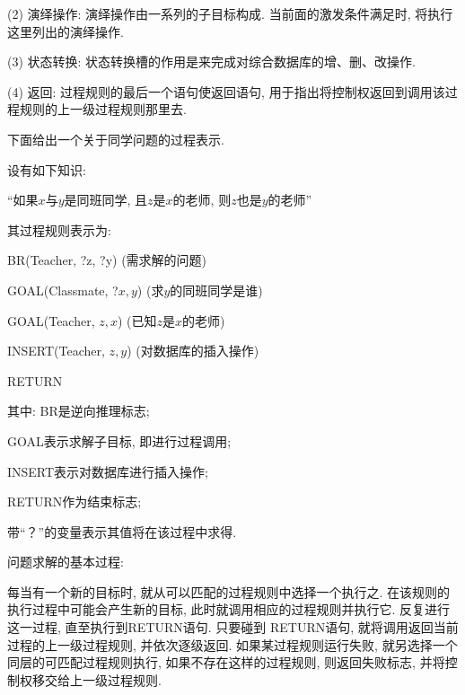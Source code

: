 (2) 演绎操作: 演绎操作由一系列的子目标构成. 当前面的激发条件满足时, 将执行这里列出的演绎操作.

(3) 状态转换: 状态转换槽的作用是来完成对综合数据库的增、删、改操作.

(4) 返回: 过程规则的最后一个语句使返回语句, 用于指出将控制权返回到调用该过程规则的上一级过程规则那里去.
\begin{example}
下面给出一个关于同学问题的过程表示.

     设有如下知识:

         “如果$x$与$y$是同班同学, 且$z$是$x$的老师,  则$z$也是$y$的老师”

    其过程规则表示为:

             BR(Teacher, ?z, ?y)         (需求解的问题)

             GOAL(Classmate, ?$x, y$)   (求$y$的同班同学是谁)

             GOAL(Teacher, $z, x$)       (已知$z$是$x$的老师)

             INSERT(Teacher,  $z, y$)     (对数据库的插入操作)

             RETURN

其中: BR是逆向推理标志;

     GOAL表示求解子目标, 即进行过程调用;

     INSERT表示对数据库进行插入操作;

     RETURN作为结束标志;

     带“？”的变量表示其值将在该过程中求得.
\end{example}
问题求解的基本过程:

每当有一个新的目标时, 就从可以匹配的过程规则中选择一个执行之. 在该规则的执行过程中可能会产生新的目标, 此时就调用相应的过程规则并执行它. 反复进行这一过程, 直至执行到RETURN语句.
只要碰到 RETURN语句, 就将调用返回当前过程的上一级过程规则, 并依次逐级返回.
如果某过程规则运行失败, 就另选择一个同层的可匹配过程规则执行, 如果不存在这样的过程规则, 则返回失败标志, 并将控制权移交给上一级过程规则.

